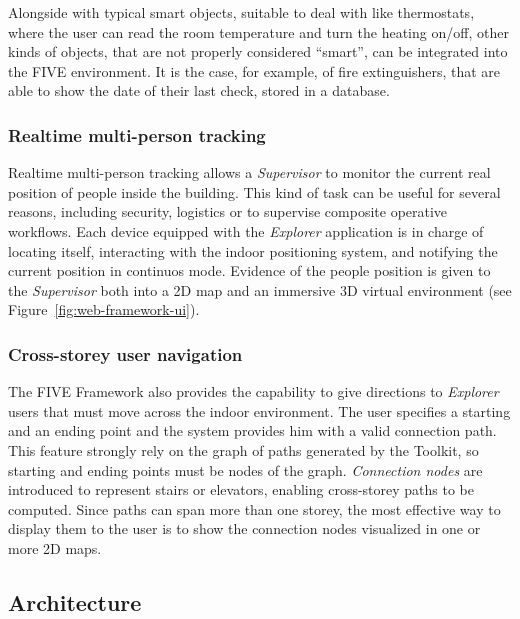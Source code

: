 Alongside with typical smart objects, suitable to deal with like thermostats,
where the user can read the room  temperature and turn the heating on/off,
other kinds of objects, that are not properly considered ``smart'', can be
integrated into the FIVE environment. It is the case, for example, of fire
extinguishers, that are able to show the date of their last check, stored in a
database.

\subsubsection{Realtime multi-person tracking}\label{realtime-multi-person-tracking}

Realtime multi-person tracking allows a \emph{Supervisor} to monitor the current
real position of people inside the building. This kind of task can be useful for
several reasons, including security, logistics or to supervise composite operative
workflows. Each device equipped with the \emph{Explorer} application is in charge of locating
itself, interacting with the indoor positioning system, and notifying the current
position in continuos mode. Evidence of the people position is given to the
\emph{Supervisor} both into a 2D map and an immersive 3D virtual environment (see Figure~\ref{fig:web-framework-ui}).

\subsubsection{Cross-storey user navigation}\label{cross-storey-user-navigation}

The FIVE Framework also provides the capability to give directions to
\emph{Explorer} users that must move across the indoor environment. The user
specifies a starting and an ending point and the system provides him with a
valid connection path. This feature strongly rely on the graph of paths
generated by the Toolkit, so starting and ending points must be nodes of the
graph. \emph{Connection nodes} are introduced to represent stairs or
elevators, enabling cross-storey paths to be computed. Since paths can span
more than one storey, the most effective way to display them to the user is to
show the connection nodes visualized in one or more 2D maps.

\subsection{Architecture}\label{architecture}

